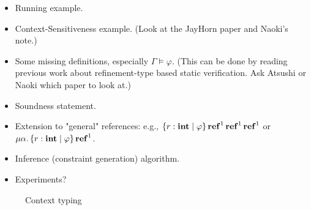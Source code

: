 \documentclass[runningheads]{llncs}
\begin{document}
\begin{itemize}
\item Running example.
\item Context-Sensitiveness example. (Look at the JayHorn paper and Naoki's note.)
\item Some missing definitions, especially $\Gamma \models \varphi$.  (This can be done by reading previous work about refinement-type based static verification.  Ask Atsushi or Naoki which paper to look at.)
\item Soundness statement.
\item Extension to "general" references: e.g., $\left\{{r : \mathbf{int} \mid \varphi}\right\} \operatorname{\mathbf{ref}}^1 \operatorname{\mathbf{ref}}^1 \operatorname{\mathbf{ref}}^1$ or $\mu\alpha. \left\{{r : \mathbf{int} \mid \varphi}\right\} \operatorname{\mathbf{ref}}^1$.
\item Inference (constraint generation) algorithm.
\item Experiments?
\end{itemize}

\newcommand\DOM{\textit{dom}}
\newcommand\EXTEND[1]{\{{#1}\}}

\begin{figure}
  \leavevmode
\caption{Context typing}
\label{fig:context-typing}
\end{figure}
\end{document}
